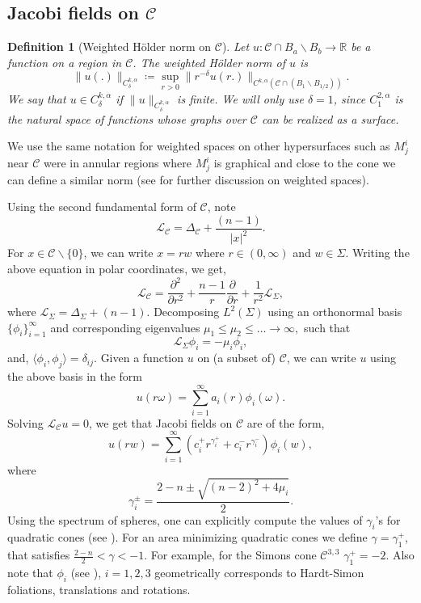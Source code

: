 \documentclass[12pt, reqno ]{amsart}
\newtheorem{definition}[theorem]{Definition}
\numberwithin{equation}{section}
\begin{document}
\subsection{Jacobi fields on $\mathcal{C}$}
\begin{definition}[Weighted H\"older norm on $\mathcal C$]
Let $u:\mathcal{C}\cap B_a\backslash B_b\rightarrow \mathbb{R}$ be a function on a region in $\mathcal{C}$. The \emph{weighted H\"older norm} of $u$ is 
\begin{equation*}
\|u(.)\|_{C^{k, \alpha}_{\delta}}\coloneqq \sup_{r > 0}\|r^{-\delta}u(r.)\|_{C^{k, \alpha}(\mathcal{C}\cap (B_1\backslash B_{1/2}))}.
\end{equation*}
We say that $u\in C^{k, \alpha}_{\delta}$ if  $\|u\|_{C^{k, \alpha}_{\delta}}$ is finite. We will only use $\delta = 1$, since $C^{2,\alpha}_1$ is the natural space of functions whose graphs over $\mathcal{C}$ can be realized as a surface. 
\end{definition}
We use the same notation for weighted spaces on other hypersurfaces such as $M_j^i$ near $\mathcal C$ were in annular regions where $M_j^i$ is graphical and close to the cone we can define a similar norm (see \cite[Chapter 4]{Marshall} for further discussion on weighted spaces).  

Using the second fundamental form of $\mathcal C$, note
$$\mathcal{L_C}=\Delta_\mathcal C+\frac{(  n-1)}{|x|^2}.  $$
For $x\in \mathcal C \backslash \{0\}$, we can write $x=rw$ where $r\in (0, \infty)$ and $w\in \Sigma$. Writing the above equation in polar coordinates, we get, 
$$\mathcal{L_C}=\frac{\partial^2}{\partial r^2}+\frac{n-1}{r}\frac{\partial }{\partial r}+\frac{1}{r^2}\mathcal L_\Sigma, $$
where $\mathcal L_\Sigma=\Delta_\Sigma+(n-1)$. Decomposing $L^2(\Sigma)$ using an orthonormal basis $\{ \phi_i\}_{i=1}^{\infty}$ and corresponding eigenvalues $\mu_1\leq \mu_2 \leq \dots \rightarrow \infty,$ such that
\begin{equation}\label{eigenvalue}
\mathcal{L}_{\Sigma} \phi_i=-\mu_i \phi_i,
\end{equation}
and, $\langle\phi_i, \phi_j\rangle=\delta_{ij}$.
Given a function $u$ on (a subset of) $\mathcal{C}$, we can write $u$ using the above basis in the form
$$u(r\omega)=\sum_{i=1}^{\infty}a_i(r) \phi_i(\omega). $$
Solving $\mathcal{L_C}u=0$, we get that Jacobi fields on $\mathcal C$ are of the form, 
\begin{equation}\label{eqn: u}
    u(rw)=\sum_{i=1}^\infty\left(c_i^+r^{\gamma_i^+}+ c_i^-r^{\gamma_i^-} \right)\phi_i(w),
\end{equation}
where
$$ \gamma^\pm_i=\frac{2-n\pm \sqrt{(n-2)^2+4\mu_i}}{2}.$$
Using the spectrum of spheres, one can explicitly compute the values of $\gamma_i$'s for quadratic cones (see \cite{SimonSolomon}).  For an area minimizing quadratic cones we define $\gamma=\gamma_1^+$, that satisfies $\frac{2-n}{2}<\gamma < -1$.  For example, for the Simons cone $\mathcal C^{3, 3}$ $\gamma_1^+=-2$.
Also note that $\phi_i$ (see \cite{SimonSolomon}),  $i=1, 2, 3$  geometrically corresponds to Hardt-Simon foliations, translations and rotations. 
\end{document}
